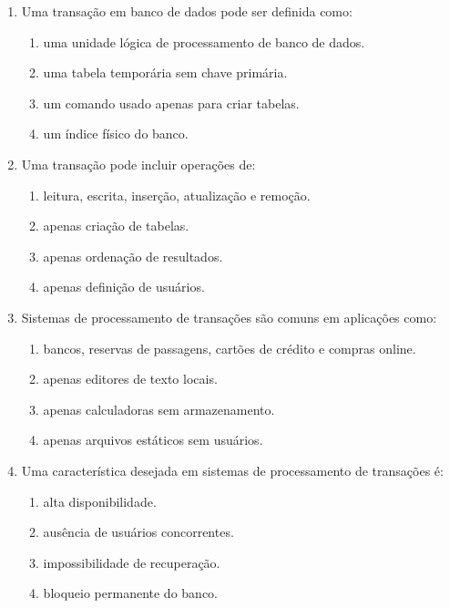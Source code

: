 \documentclass[12pt,a4paper]{article}
\begin{document}
\begin{enumerate}[label=\textbf{Q\arabic*.}]

\item Uma transação em banco de dados pode ser definida como:

\begin{enumerate}[label=\alph*)]
    \item uma unidade lógica de processamento de banco de dados.
    \item uma tabela temporária sem chave primária.
    \item um comando usado apenas para criar tabelas.
    \item um índice físico do banco.
\end{enumerate}

\item Uma transação pode incluir operações de:

\begin{enumerate}[label=\alph*)]
    \item leitura, escrita, inserção, atualização e remoção.
    \item apenas criação de tabelas.
    \item apenas ordenação de resultados.
    \item apenas definição de usuários.
\end{enumerate}

\item Sistemas de processamento de transações são comuns em aplicações como:

\begin{enumerate}[label=\alph*)]
    \item bancos, reservas de passagens, cartões de crédito e compras online.
    \item apenas editores de texto locais.
    \item apenas calculadoras sem armazenamento.
    \item apenas arquivos estáticos sem usuários.
\end{enumerate}

\item Uma característica desejada em sistemas de processamento de transações é:

\begin{enumerate}[label=\alph*)]
    \item alta disponibilidade.
    \item ausência de usuários concorrentes.
    \item impossibilidade de recuperação.
    \item bloqueio permanente do banco.
\end{enumerate}


\end{enumerate}
\end{document}
